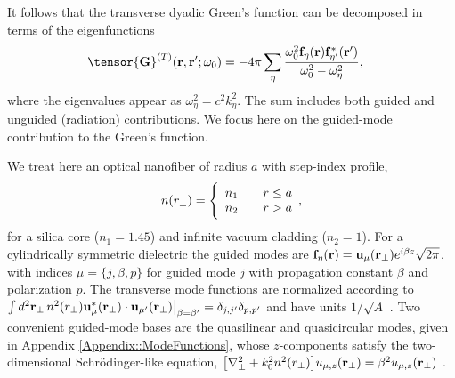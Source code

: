 \documentclass[preprint,aps,pra,onecolumn]{revtex4-1} %
\newcommand{\fidx}{\eta}
\newcommand{\eigenf}{\mbf{f}_\fidx}
\newcommand{\eigenfp}{\mbf{f}_{\fidx'}}
\begin{document}
It follows that the transverse dyadic Green's function can be decomposed in terms of the eigenfunctions~\cite{sakoda_optical_1996, sondergaard_general_2001}
	\begin{align}
		\tensor{\mathbf{G}}^{(T)}(\br,\br'; \omega_0)%
	&= -4\pi \sum_{\fidx} \frac{  \omega_0^2 \eigenf (\br) 
\eigenfp^* (\br')}{\omega_0^2-\omega_\fidx^2},
	\end{align}
where the eigenvalues appear as $\omega_\fidx^2 = c^2 k_\fidx^2$.  The sum includes both guided and unguided (radiation) contributions. We focus here on the guided-mode contribution to the Green's function. 

We treat here an optical nanofiber of radius $a$ with step-index profile,
	\begin{align} \label{Eq::IndexofRefraction}
		n(r_\perp) = \Bigg\{  
			\begin{array}{l l} n_1 & \quad r \leq a \\
						 n_2 & \quad r > a 
		\end{array},
	\end{align}
for a silica core ($n_1 = 1.45$) and infinite vacuum cladding ($n_2 = 1$).  For a cylindrically symmetric dielectric the guided modes are $\eigenf (\br) = \mathbf{u}_\mu (\br_\perp) e^{i\beta z}\sqrt{2 \pi}$, with indices $\mu=\{j, \beta, p\}$ for guided mode $j$ with propagation constant $\beta$ and polarization $p$.  The transverse mode functions are normalized according to $\int d^2 \mathbf{r}_\perp \, n^2(r_\perp)\mathbf{u}^*_\mu (\mathbf{r}_\perp) \cdot \mathbf{u}_{\mu'} (\mathbf{r}_\perp)\big|_{\beta = \beta'} = \delta_{j,j'}\delta_{p,p'}$ and have units $1/\sqrt{A}$ \cite{le_kien_anisotropy_2014}.  Two convenient guided-mode bases are the quasilinear and quasicircular modes, given in  Appendix \ref{Appendix::ModeFunctions}, whose $z$-components satisfy the two-dimensional Schr\"{o}dinger-like equation, $\big[\nabla_\perp^2 +k_0^2 n^2(r_\perp) \big] u_{\mu,z} (\mathbf{r}_\perp) = \beta^2 u_{\mu,z} (\mathbf{r}_\perp)$ \cite{kien_field_2004}.  
\end{document}

